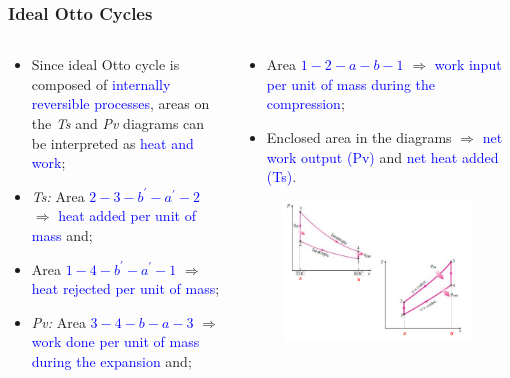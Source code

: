 \documentclass[10pt,compress]{beamer}
\begin{document}
\begin{frame}
 \frametitle{Ideal Otto Cycles}
  \begin{columns}
   \begin{column}[c]{0.4\linewidth}
    \begin{itemize}
     \item <1-> Since ideal Otto cycle is composed of \textcolor{blue}{internally reversible processes}, areas on the {\it Ts} and {\it Pv} diagrams can be interpreted as \textcolor{blue}{heat and work};
     \item <2-> {\it Ts:} Area \textcolor{blue}{$2-3-b^{\prime}-a^{\prime}-2$} $\Rightarrow$ \textcolor{blue}{heat added per unit of mass} and;
     \item <3-> Area \textcolor{blue}{$1-4-b^{\prime}-a^{\prime}-1$} $\Rightarrow$ \textcolor{blue}{heat rejected per unit of mass};
     \item <4-> {\it Pv:} Area \textcolor{blue}{$3-4-b-a-3$} $\Rightarrow$  \textcolor{blue}{work done per unit of mass during the expansion} and;
    \end{itemize}
   \end{column}
   \begin{column}[c]{0.6\linewidth}
    \begin{itemize}
     \item <5-> Area \textcolor{blue}{$1-2-a-b-1$} $\Rightarrow$ \textcolor{blue}{work input per unit of mass during the compression};
     \item <6-> Enclosed area in the diagrams $\Rightarrow$ \textcolor{blue}{net work output (Pv)} and \textcolor{blue}{net heat added (Ts)}.
    \end{itemize}
    \begin{figure}%
     \begin{center}
      \includegraphics[width=7.cm,clip]{./Pics/InternalCombustion_IdealOttoCycle3}
     \end{center}
    \end{figure}  
   \end{column}  
  \end{columns}
\end{frame}
\end{document}
